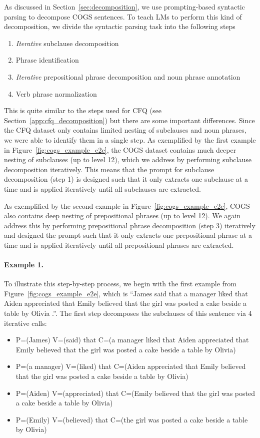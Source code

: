 \documentclass{article} \usepackage{iclr2022_conference,times}
\newcommand{\example}[1]{\begin{itemize} #1 \end{itemize}}
\newcommand{\ex}{\item}
\begin{document}
As discussed in Section~\ref{sec:decomposition}, we use prompting-based syntactic parsing to decompose COGS sentences. To teach LMs to perform this kind of decomposition, we divide the syntactic parsing task into the following steps

\begin{enumerate}
    \item \emph{Iterative} subclause decomposition
    \item Phrase identification
    \item \emph{Iterative} prepositional phrase decomposition and noun phrase annotation
    \item Verb phrase normalization
\end{enumerate}

This is quite similar to the steps used for CFQ (see Section~\ref{app:cfq_decomposition}) but there are some important differences. Since the CFQ dataset only contains limited nesting of subclauses and noun phrases, we were able to identify them in a single step. As exemplified by the first example in Figure~\ref{fig:cogs_example_e2e}, the COGS dataset contains much deeper nesting of subclauses (up to level 12), which we address by performing subclause decomposition iteratively. This means that the prompt for subclause decomposition (step 1) is designed such that it only extracts one subclause at a time and is applied iteratively until all subclauses are extracted.

As exemplified by the second example in Figure~\ref{fig:cogs_example_e2e}, COGS also contains deep nesting of prepositional phrases (up to level 12). We again address this by performing prepositional phrase decomposition (step 3) iteratively and designed the prompt such that it only extracts one prepositional phrase at a time and is applied iteratively until all prepositional phrases are extracted.

\paragraph{Example 1.}
To illustrate this step-by-step process, we begin with the first example from Figure~\ref{fig:cogs_example_e2e}, which is ``James said that a manager liked that Aiden appreciated that Emily believed that the girl was posted a cake beside a table by Olivia .''.  The first step decomposes the subclauses of this sentence via 4 iterative calls:

\example{
\ex P=(James) V=(said) that C=(a manager liked that Aiden appreciated that Emily believed that the girl was posted a cake beside a table by Olivia)
\ex P=(a manager) V=(liked) that C=(Aiden appreciated that Emily believed that the girl was posted a cake beside a table by Olivia)
\ex P=(Aiden) V=(appreciated) that C=(Emily believed that the girl was posted a cake beside a table by Olivia)
\ex P=(Emily) V=(believed) that C=(the girl was posted a cake beside a table by Olivia)
}
\end{document}
